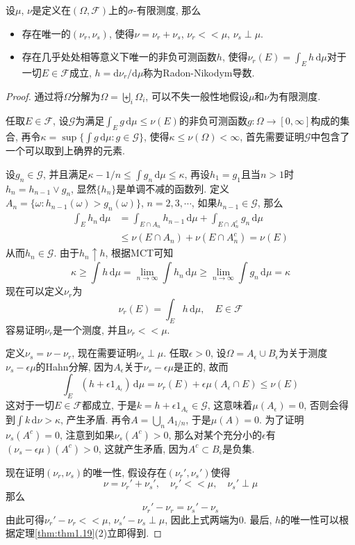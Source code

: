\documentclass[cn, 12pt, math=mtpro2, bibstyle=apa, blue, twocol]{elegantbook}
\newcommand{\F}{\mathcal{F}}
\newcommand{\limn}{\lim_{n\to\infty}}
\begin{document}
\begin{theorem}\label{thm:thm1.18}
设$\mu$, $\nu$是定义在$(\Omega,\F)$上的$\sigma$-有限测度, 那么
\begin{itemize}
  \item 存在唯一的$(\nu_r,\nu_s)$, 使得$\nu=\nu_r+\nu_s$, $\nu_r<<\mu$, $\nu_s\perp\mu$.
  \item 存在几乎处处相等意义下唯一的非负可测函数$h$, 使得$\nu_r(E)=\int_Eh\,\text{d}\mu$对于一切$E\in\F$成立, $h=\text{d}\nu_r/\text{d}\mu$称为Radon-Nikodym导数.
\end{itemize}
\end{theorem}
\begin{proof}
  通过将$\Omega$分解为$\Omega=\biguplus_i\Omega_i$, 可以不失一般性地假设$\mu$和$\nu$为有限测度.

  任取$E\in\F$, 设$\mathcal{G}$为满足$\int_Eg\,\text{d}\mu\leq\nu(E)$的非负可测函数$g:\Omega\to [0,\infty]$构成的集合, 再令$\kappa=\sup\{\int g\,\text{d}\mu: g\in\mathcal{G}\}$, 使得$\kappa\leq\nu(\Omega)<\infty$, 首先需要证明$\mathcal{G}$中包含了一个可以取到上确界的元素.

  设$g_n\in\mathcal{G}$, 并且满足$\kappa-1/n\leq\int g_n\,\text{d}\mu\leq\kappa$, 再设$h_1=g_1$且当$n>1$时$h_n=h_{n-1}\vee g_n$, 显然$\{h_n\}$是单调不减的函数列. 定义$A_n=\{\omega: h_{n-1}(\omega)> g_n(\omega)\}$, $n=2,3,\cdots$, 如果$h_{n-1}\in\mathcal{G}$, 那么
  \begin{align*}
  \int_E h_n\,\text{d}\mu&=\int_{E\cap A_n}h_{n-1}\,\text{d}\mu+\int_{E\cap A_n^c}g_n\,\text{d}\mu \\
  &\leq\nu(E\cap A_n)+\nu(E\cap A_n^c)=\nu(E)
  \end{align*}
  从而$h_n\in\mathcal{G}$. 由于$h_n\uparrow h$, 根据MCT可知
  $$\kappa\geq\int h\,\text{d}\mu=\limn\int h_n\,\text{d}\mu\geq\limn\int g_n\,\text{d}\mu=\kappa$$
  现在可以定义$\nu_r$为
  $$\nu_r(E)=\int_Eh\,\text{d}\mu,\quad E\in\F$$
  容易证明$\nu_r$是一个测度, 并且$\nu_r<<\mu$.

  定义$\nu_s=\nu-\nu_r$, 现在需要证明$\nu_s\perp\mu$. 任取$\epsilon>0$, 设$\Omega=A_\epsilon\cup B_\epsilon$为关于测度$\nu_s-\epsilon\mu$的Hahn分解, 因为$A_\epsilon$关于$\nu_s-\epsilon\mu$是正的, 故而
  $$\int_E(h+\epsilon 1_{A_\epsilon})\,\text{d}\mu=\nu_r(E)+\epsilon\mu(A_\epsilon\cap E)\leq \nu(E)$$
  这对于一切$E\in\F$都成立, 于是$k=h+\epsilon 1_{A_\epsilon}\in\mathcal{G}$, 这意味着$\mu(A_\epsilon)=0$, 否则会得到$\int k\,\text{d}\nu>\kappa$, 产生矛盾. 再令$A=\bigcup_nA_{1/n}$, 于是$\mu(A)=0$. 为了证明$\nu_s(A^c)=0$, 注意到如果$\nu_s(A^c)>0$, 那么对某个充分小的$\epsilon$有$(\nu_s-\epsilon\mu)(A^c)>0$, 这就产生矛盾, 因为$A^c\subset B_\epsilon$是负集.

  现在证明$(\nu_r,\nu_s)$的唯一性, 假设存在$(\nu_r',\nu_s')$使得
  $$\nu=\nu_r'+\nu_s',\quad \nu_r'<<\mu,\quad \nu_s'\perp\mu$$
  那么
  $$\nu_r'-\nu_r=\nu_s'-\nu_s$$
  由此可得$\nu_r'-\nu_r<<\mu$, $\nu_s'-\nu_s\perp\mu$, 因此上式两端为0. 最后, $h$的唯一性可以根据定理\ref{thm:thm1.19}(2)立即得到.
\end{proof}
\end{document}
